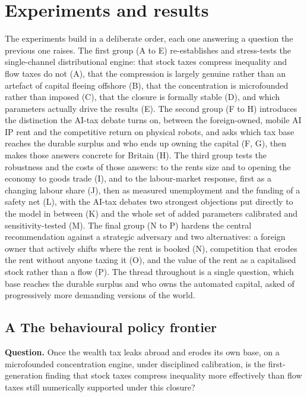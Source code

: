 \documentclass[12pt]{article}
\begin{document}
\hypertarget{experiments}{}
\hypertarget{experiments-and-results}{%
\section{Experiments and results}\label{experiments-and-results}}

The experiments build in a deliberate order, each one answering a
question the previous one raises. The first group (A to E)
re-establishes and stress-tests the single-channel distributional
engine: that stock taxes compress inequality and flow taxes do not (A),
that the compression is largely genuine rather than an artefact of
capital fleeing offshore (B), that the concentration is microfounded
rather than imposed (C), that the closure is formally stable (D), and
which parameters actually drive the results (E). The second group (F to
H) introduces the distinction the AI-tax debate turns on, between the
foreign-owned, mobile AI IP rent and the competitive return on physical
robots, and asks which tax base reaches the durable surplus and who ends
up owning the capital (F, G), then makes those answers concrete for
Britain (H). The third group tests the robustness and the costs of those
answers: to the rent\textquotesingle s size and to opening the economy
to goods trade (I), and to the labour-market response, first as a
changing labour share (J), then as measured unemployment and the funding
of a safety net (L), with the AI-tax debate\textquotesingle s two
strongest objections put directly to the model in between (K) and the
whole set of added parameters calibrated and sensitivity-tested (M). The
final group (N to P) hardens the central recommendation against a
strategic adversary and two alternatives: a foreign owner that actively
shifts where the rent is booked (N), competition that erodes the rent
without anyone taxing it (O), and the value of the rent as a capitalised
stock rather than a flow (P). The thread throughout is a single
question, which base reaches the durable surplus and who owns the
automated capital, asked of progressively more demanding versions of the
world.

\hypertarget{a-the-behavioural-policy-frontier}{%
\subsection{A \textperiodcentered{} The behavioural policy
frontier}\label{a-the-behavioural-policy-frontier}}

\textbf{Question.} Once the wealth tax leaks abroad and erodes its own
base, on a microfounded concentration engine, under disciplined
calibration, is the first-generation finding that stock taxes compress
inequality more effectively than flow taxes still numerically supported
under this closure?
\end{document}
